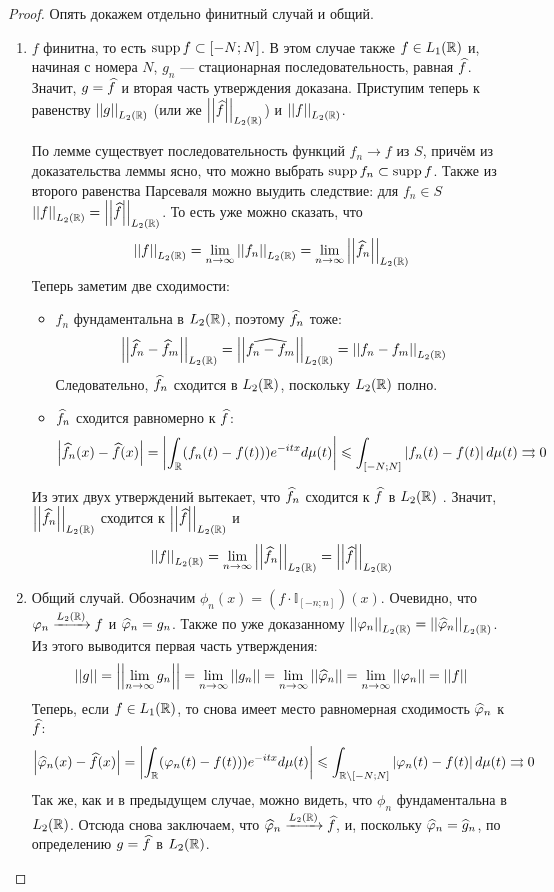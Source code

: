 \begin{proof}
	Опять докажем отдельно финитный случай и общий.
	\begin{enumerate}
		\item $f$ финитна, то есть $\operatorname{supp} f \subset [-N; N]$. В этом случае также $f \in L_1(\mathbb{R})$ и, начиная с номера $N$, $g_n$ --- стационарная последовательность, равная $\widehat f$. Значит, $g = \widehat f$ и вторая часть утверждения доказана. Приступим теперь к равенству $\left|\left|g\right|\right|_{L_2(\mathbb{R})}$ (или же $\left|\left|\widehat f\right|\right|_{L_2(\mathbb{R})}$) и $\left|\left|f\right|\right|_{L_2(\mathbb{R})}$.
		
		По лемме существует последовательность функций $f_n \to f$ из $S$, причём из доказательства леммы ясно, что можно выбрать $\operatorname{supp} f_n \subset \operatorname{supp} f$. Также из второго равенства Парсеваля можно выудить следствие: для $f_n \in S$ $\left|\left|f\right|\right|_{L_2(\mathbb{R})} = \left|\left|\widehat f\right|\right|_{L_2(\mathbb{R})}$. То есть уже можно сказать, что
		\[
			\left|\left|f\right|\right|_{L_2(\mathbb{R})} = \lim_{n \to \infty} \left|\left|f_n\right|\right|_{L_2(\mathbb{R})} = \lim_{n \to \infty} \left|\left|\widehat f_n\right|\right|_{L_2(\mathbb{R})}
		\]
		Теперь заметим две сходимости:
		\begin{itemize}
			\item $f_n$ фундаментальна в $L_2(\mathbb{R})$, поэтому $\widehat f_n$ тоже:
			\[
				\left|\left|\widehat f_n - \widehat f_m\right|\right|_{L_2(\mathbb{R})} = 		\left|\left|\widehat{f_n - f_m}\right|\right|_{L_2(\mathbb{R})} = \left|\left|f_n - f_m\right|\right|_{L_2(\mathbb{R})}
			\]
			Следовательно, $\widehat f_n$ сходится в $L_2(\mathbb{R})$, поскольку $L_2(\mathbb{R})$ полно.
			
			\item $\widehat f_n$ сходится равномерно к $\widehat f$:
			\[
				\left|\widehat f_n(x) - \widehat f(x)\right| = \left|\int_{\mathbb{R}} (f_n(t) - f(t)))e^{-itx} d\mu(t)\right| \leqslant \int_{[-N; N]} \left|f_n(t) - f(t)\right| d\mu(t) \rightrightarrows 0
			\]
		\end{itemize}
		Из этих двух утверждений вытекает, что $\widehat f_n$ сходится к $\widehat f$ в $L_2(\mathbb{R})$ . Значит, $\left|\left|\widehat f_n\right|\right|_{L_2(\mathbb{R})}$ сходится к $\left|\left|\widehat f\right|\right|_{L_2(\mathbb{R})}$ и
		\[
			\left|\left|f\right|\right|_{L_2(\mathbb{R})} = \lim_{n \to \infty} \left|\left|\widehat f_n\right|\right|_{L_2(\mathbb{R})} = \left|\left|\widehat f\right|\right|_{L_2(\mathbb{R})}
		\]
		
		\item Общий случай. Обозначим $\phi_n(x) = (f \cdot \mathbb{I}_{[-n; n]})(x)$. Очевидно, что $\varphi_n \xrightarrow{L_2(\mathbb{R})} f$ и $\widehat {\varphi}_n = g_n$. Также по уже доказанному $\left|\left|\varphi_n\right|\right|_{L_2(\mathbb{R})} = \left|\left|\widehat {\varphi}_n\right|\right|_{L_2(\mathbb{R})}$. Из этого выводится первая часть утверждения:
		\[
			\left|\left|g\right|\right| = \left|\left|\lim_{n \to \infty} g_n\right|\right| = \lim_{n \to \infty} \left|\left|g_n\right|\right| = \lim_{n \to \infty} \left|\left|\widehat {\varphi}_n\right|\right| = \lim_{n \to \infty} \left|\left|\varphi_n\right|\right| = \left|\left|f\right|\right|
		\]
		Теперь, если $f \in L_1(\mathbb{R})$, то снова имеет место равномерная сходимость $\widehat {\varphi}_n$ к $\widehat f$:
		\[
			\left|\widehat {\varphi}_n(x) - \widehat f(x)\right| = \left|\int_{\mathbb{R}} (\varphi_n(t) - f(t)))e^{-itx} d\mu(t)\right| \leqslant \int_{\mathbb{R} \setminus [-N; N]} \left|\varphi_n(t) - f(t)\right| d\mu(t) \rightrightarrows 0
		\]
		Так же, как и в предыдущем случае, можно видеть, что $\phi_n$ фундаментальна в $L_2(\mathbb{R})$. Отсюда снова заключаем, что $\widehat {\varphi}_n \xrightarrow{L_2(\mathbb{R})} \widehat f$, и, поскольку $\widehat {\varphi}_n = \widehat g_n$, по определению $g = \widehat f$ в $L_2(\mathbb{R})$.
	\end{enumerate}
\end{proof}

